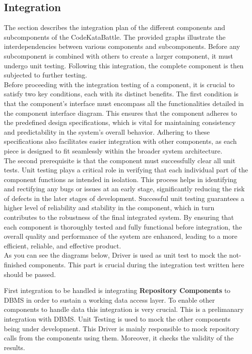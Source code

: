 \subsection{Integration}
\indent The section describes the integration plan of the different components and subcomponents of the CodeKataBattle. The provided graphs illustrate the interdependencies between various components and subcomponents. Before any subcomponent is combined with others to create a larger component, it must undergo unit testing. Following this integration, the complete component is then subjected to further testing.
\\
\indent Before proceeding with the integration testing of a component, it is crucial to satisfy two key conditions, each with its distinct benefits. The first condition is that the component's interface must encompass all the functionalities detailed in the component interface diagram. This ensures that the component adheres to the predefined design specifications, which is vital for maintaining consistency and predictability in the system’s overall behavior. Adhering to these specifications also facilitates easier integration with other components, as each piece is designed to fit seamlessly within the broader system architecture.
\\
\indent The second prerequisite is that the component must successfully clear all unit tests. Unit testing plays a critical role in verifying that each individual part of the component functions as intended in isolation. This process helps in identifying and rectifying any bugs or issues at an early stage, significantly reducing the risk of defects in the later stages of development. Successful unit testing guarantees a higher level of reliability and stability in the component, which in turn contributes to the robustness of the final integrated system. By ensuring that each component is thoroughly tested and fully functional before integration, the overall quality and performance of the system are enhanced, leading to a more efficient, reliable, and effective product.
\\
\indent As you can see the diagrams below, Driver is used as unit test to mock the not-finished components. This part is crucial during the integration test written here should be passed. 

\newpage
\indent First integration to be handled is integrating \textbf{Repository Components} to DBMS in order to sustain a working data access layer. To enable other components to handle data this integration is very crucial. This is a prelimanary integration with DBMS. Unit Testing is used to mock the  other components being under development. This Driver is mainly responsible to mock repository calls from the components using them. Moreover, it checks the validity of the results.

